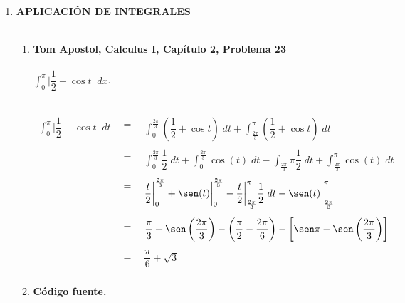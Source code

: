 \begin{enumerate}
\begin{enumerate}[\bfseries a)]
    \end{enumerate}

\newpage

\item \textbf{\large APLICACIÓN DE INTEGRALES}\\\\

    \begin{enumerate}[\bfseries a)]

	\item \textbf{\large Tom Apostol, Calculus I, Capítulo 2, Problema 23}\\\\
	$\displaystyle\int_0^\pi  \bigg|\dfrac{1}{2} + \cos t\bigg|\; dx$.\\\\
	    \begin{center}
		\begin{tabular}{rcl}
		    $\displaystyle\int_{0}^{\pi} \bigg| \dfrac{1}{2}+\cos t\bigg| \; dt$&$=$&$\displaystyle\int_0^{\frac{2\pi}{3}}\left(\dfrac{1}{2} + \cos t\right)\; dt + \int_{\frac{2\pi}{3}}^{\pi}\left(\dfrac{1}{2} + \cos t\right)\; dt$\\\\
											&$=$&$\displaystyle\int_0^{\frac{2\pi}{3}} \dfrac{1}{2}\; dt + \int_{0}^{\frac{2\pi}{3}} \cos(t) \; dt - \int_{\frac{2\pi}{3}}\pi \dfrac{1}{2}\; dt + \int_{\frac{2\pi}{3}}^\pi \cos(t) \; dt$\\\\
											&$=$&$\dfrac{t}{2}\bigg|_0^{\frac{2\pi}{3}} + \sen(t)\bigg|_{0}^{\frac{2\pi}{3}} -  \dfrac{t}{2} \bigg|_{\frac{2\pi}{3}}^\pi \dfrac{1}{2}\; dt - \sen(t)\bigg|_{\frac{2\pi}{3}}^\pi$\\\\
											&$=$&$\dfrac{\pi}{3}+\sen\left(\dfrac{2\pi}{3}\right) - \left(\dfrac{\pi}{2}-\dfrac{2\pi}{6}\right)-\left[\sen \pi - \sen\left( \dfrac{2\pi}{3}\right)\right]$\\\\
											&$=$&$\dfrac{\pi}{6}+\sqrt{3}$\\\\
		\end{tabular}
	    \end{center}

	\item \textbf{Código fuente.}\\ 
	    
	    
	    \vspace{.5cm}
	

\end{enumerate}
\end{enumerate}
